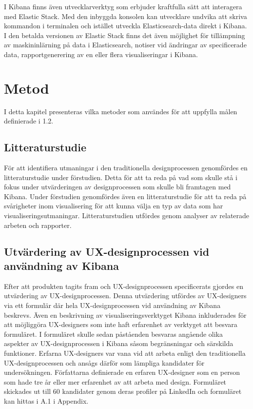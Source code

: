 \documentclass[12pt]{kththesis}
\begin{document}
I Kibana finns även utvecklarverktyg som erbjuder kraftfulla sätt att interagera med Elastic Stack. Med den inbyggda konsolen kan utvecklare undvika att skriva kommandon i terminalen och istället utveckla Elasticsearch-data direkt i Kibana. I den betalda versionen av Elastic Stack finns det även möjlighet för tillämpning av maskininlärning på data i Elasticsearch, notiser vid ändringar av specificerade data, rapportgenerering av en eller flera visualiseringar i Kibana.

\afterpage{\null\newpage}

\chapter{Metod}

I detta kapitel presenteras vilka metoder som användes för att uppfylla målen definierade i 1.2. 

\section{Litteraturstudie}

För att identifiera utmaningar i den traditionella designprocessen genomfördes en litteraturstudie under förstudien. Detta för att ta reda på vad som skulle stå i fokus under utvärderingen av designprocessen som skulle bli framtagen med Kibana. Under förstudien genomfördes även en litteraturstudie för att ta reda på svårigheter inom visualisering för att kunna välja en typ av data som har visualiseringsutmaningar. Litteraturstudien utfördes genom analyser av relaterade arbeten och rapporter.

\section{Utvärdering av UX-designprocessen vid användning av Kibana}

Efter att produkten tagits fram och UX-designprocessen specificerats gjordes en utvärdering av UX-designprocessen. Denna utvärdering utfördes av UX-designers via ett formulär där hela UX-designprocessen vid användning av Kibana beskrevs. Även en beskrivning av visualiseringsverktyget Kibana inkluderades för att möjliggöra UX-designers som inte haft erfarenhet av verktyget att besvara formuläret. I formuläret skulle sedan påståenden besvaras angående olika aspekter av UX-designprocessen i Kibana såsom begränsningar och särskilda funktioner. Erfarna UX-designers var vana vid att arbeta enligt den traditionella UX-designprocessen och ansågs därför som lämpliga kandidater för undersökningen. Författarna definierade en erfaren UX-designer som en person som hade tre år eller mer erfarenhet av att arbeta med design. Formuläret skickades ut till 60 kandidater genom deras profiler på LinkedIn och formuläret kan hittas i A.1 i Appendix.
\end{document}

